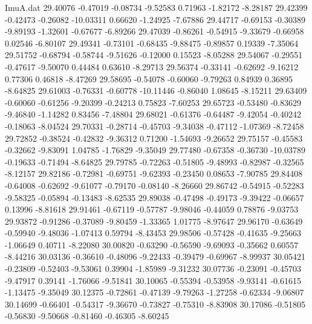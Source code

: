 \begin{filecontents}{ImuA.dat}
  29.40076   -0.47019   -0.08734   -9.52583    0.71963   -1.82172   -8.28187
  29.42399   -0.42473   -0.26082  -10.03311    0.66620   -1.24925   -7.67886
  29.44717   -0.69153   -0.30389   -9.89193   -1.32601   -0.67677   -6.89266
  29.47039   -0.86261   -0.54915   -9.33679   -0.66958    0.02546   -6.80107
  29.49341   -0.73101   -0.68435   -9.88475   -0.89857    0.19339   -7.35064
  29.51752   -0.68794   -0.58744   -9.51626   -0.12000    0.15523   -8.05288
  29.54067   -0.29551   -0.47617   -9.50070    0.44484    0.63610   -8.29713
  29.56374   -0.33141   -0.62692   -9.16212    0.77306    0.46818   -8.47269
  29.58695   -0.54078   -0.60060   -9.79263    0.84939    0.36895   -8.64825
  29.61003   -0.76331   -0.60778  -10.11446   -0.86040    1.08645   -8.15211
  29.63409   -0.60060   -0.61256   -9.20399   -0.24213    0.75823   -7.60253
  29.65723   -0.53480   -0.83629   -9.46840   -1.14282    0.83456   -7.48804
  29.68021   -0.61376   -0.64487   -9.42054   -0.40242   -0.18063   -8.04524
  29.70331   -0.28714   -0.45703   -9.34038   -0.47112   -1.07369   -8.72458
  29.72852   -0.38524   -0.42832   -9.36312    0.71200   -1.54693   -9.26652
  29.75157   -0.45583   -0.32662   -9.83091    1.04785   -1.76829   -9.35049
  29.77480   -0.67358   -0.36730  -10.03789   -0.19633   -0.71494   -8.64825
  29.79785   -0.72263   -0.51805   -9.48993   -0.82987   -0.32565   -8.12157
  29.82186   -0.72981   -0.69751   -9.62393   -0.23450    0.08653   -7.90785
  29.84408   -0.64008   -0.62692   -9.61077   -0.79170   -0.08140   -8.26660
  29.86742   -0.54915   -0.52283   -9.58325   -0.05894   -0.13483   -8.62535
  29.89038   -0.47498   -0.49173   -9.39422   -0.06657    0.13996   -8.81618
  29.91461   -0.67119   -0.57787   -9.98046   -0.44059    0.78876   -9.03753
  29.93872   -0.91286   -0.37089   -9.80459   -1.33365    1.01775   -8.97647
  29.96170   -0.63649   -0.59940   -9.48036   -1.07413    0.59794   -8.43453
  29.98506   -0.57428   -0.41635   -9.25663   -1.06649    0.40711   -8.22080
  30.00820   -0.63290   -0.56590   -9.69093   -0.35662    0.60557   -8.44216
  30.03136   -0.36610   -0.48096   -9.22433   -0.39479   -0.69967   -8.99937
  30.05421   -0.23809   -0.52403   -9.53061    0.39904   -1.85989   -9.31232
  30.07736   -0.23091   -0.45703   -9.47917    0.39141   -1.76066   -9.51841
  30.10065   -0.55394   -0.53958   -9.93141   -0.61615   -1.13475   -9.35049
  30.12375   -0.72861   -0.47139   -9.79263   -1.27258   -0.62334   -9.06807
  30.14699   -0.66401   -0.54317   -9.36670   -0.73827   -0.75310   -8.83908
  30.17086   -0.51805   -0.56830   -9.50668   -0.81460   -0.46305   -8.60245

\end{filecontents}
